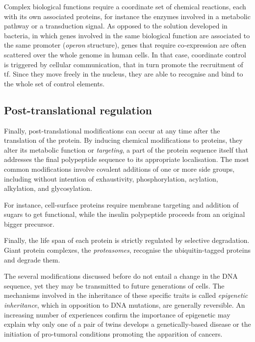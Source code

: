 Complex biological functions require a coordinate set of chemical reactions, each with its own associated proteins, for instance the enzymes involved in a metabolic pathway or a transduction signal. As opposed to the solution developed in bacteria, in which genes involved in the same biological function are associated to the same promoter (\emph{operon} structure), genes that require co-expression are often scattered over the whole genome in human cells. In that case, coordinate control is triggered by \gls{cellular communication}, that in turn promote the recruitment of \acrshort{tf}. Since they move freely in the nucleus,  they are able to recognise and bind to the whole set of control elements.



\subsection{Post-translational regulation}
\label{subsec:post-transla}
Finally, post-translational modifications can occur at any time after the translation of the protein. By inducing chemical modifications to proteins, they alter its metabolic function or \emph{targeting}, a part of the protein sequence itself that addresses the final polypeptide sequence to its appropriate localisation. The most common modifications involve covalent additions of one or more side groups, including without intention of exhaustivity, phosphorylation, acylation, alkylation, and glycosylation. 

For instance, cell-surface proteins require membrane targeting and addition of sugars to get functional, while the insulin polypeptide proceeds from an original bigger precursor. 

Finally, the life span of each protein is strictly regulated by selective degradation. Giant protein complexes, the \emph{proteasomes}, recognise the ubiquitin-tagged proteins and degrade them. 


The several modifications discussed before do not entail a change in the DNA sequence, yet they may be transmitted to future generations of cells. The mechanisms involved in the inheritance of these specific traits is called \emph{epigenetic inheritance}, which in opposition to DNA mutations, are generally reversible. An increasing number of experiences confirm the importance of epigenetic may explain why only one of a pair of twins develops a genetically-based disease or the initiation of pro-tumoral conditions promoting the apparition of cancers. 

